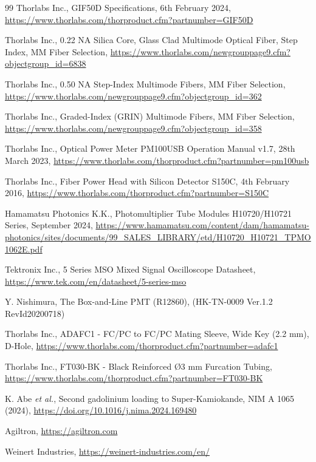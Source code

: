 \documentclass[a4paper,11pt]{article}
\begin{document}
\begin{thebibliography}{99}
Thorlabs Inc., GIF50D Specifications, 6th February 2024, \url{https://www.thorlabs.com/thorproduct.cfm?partnumber=GIF50D}

Thorlabs Inc., 0.22 NA Silica Core, Glass Clad Multimode Optical Fiber, Step Index, MM Fiber Selection, \url{https://www.thorlabs.com/newgrouppage9.cfm?objectgroup_id=6838}

Thorlabs Inc., 0.50 NA Step-Index Multimode Fibers, MM Fiber Selection, \url{https://www.thorlabs.com/newgrouppage9.cfm?objectgroup_id=362}

Thorlabs Inc., Graded-Index (GRIN) Multimode Fibers, MM Fiber Selection, \url{https://www.thorlabs.com/newgrouppage9.cfm?objectgroup_id=358}


Thorlabs Inc., Optical Power Meter PM100USB Operation Manual v1.7, 28th March 2023, \url{https://www.thorlabs.com/thorproduct.cfm?partnumber=pm100usb}

Thorlabs Inc., Fiber Power Head with Silicon Detector S150C, 4th February 2016, \url{https://www.thorlabs.com/thorproduct.cfm?partnumber=S150C}

Hamamatsu Photonics K.K., Photomultiplier Tube Modules H10720/H10721 Series, September 2024, \url{https://www.hamamatsu.com/content/dam/hamamatsu-photonics/sites/documents/99_SALES_LIBRARY/etd/H10720_H10721_TPMO1062E.pdf}

Tektronix Inc., 5 Series MSO Mixed Signal Oscilloscope Datasheet, \url{https://www.tek.com/en/datasheet/5-series-mso}

Y. Nishimura, The Box-and-Line PMT (R12860), (HK-TN-0009 Ver.1.2 RevId20200718)

Thorlabs Inc., ADAFC1 - FC/PC to FC/PC Mating Sleeve, Wide Key (2.2 mm), D-Hole, \url{https://www.thorlabs.com/thorproduct.cfm?partnumber=adafc1}

Thorlabs Inc., FT030-BK - Black Reinforced Ø3 mm Furcation Tubing, \url{https://www.thorlabs.com/thorproduct.cfm?partnumber=FT030-BK}

K. Abe {\it et al.}, Second gadolinium loading to Super-Kamiokande, NIM A 1065 (2024), \url{https://doi.org/10.1016/j.nima.2024.169480}


Agiltron, \url{https://agiltron.com}

Weinert Industries, \url{https://weinert-industries.com/en/}


\end{thebibliography}
\end{document}
